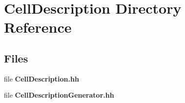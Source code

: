 \section{Cell\-Description Directory Reference}
\label{dir_6d3af5ca1d694fc32fdc13536b583bc5}
\subsection*{Files}
\begin{DoxyCompactItemize}
\item 
file {\bfseries Cell\-Description.\-hh}
\item 
file {\bfseries Cell\-Description\-Generator.\-hh}
\end{DoxyCompactItemize}
